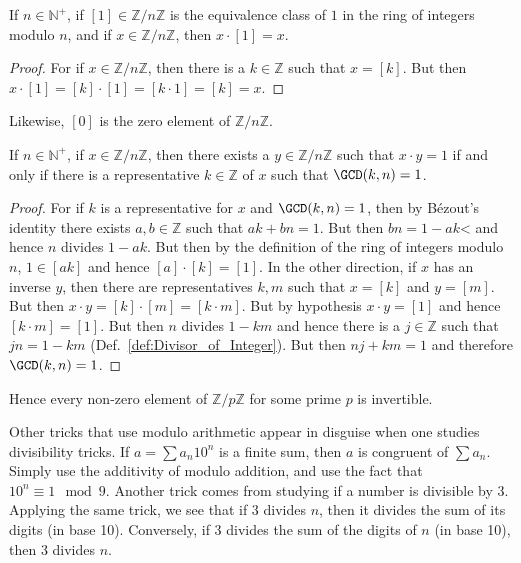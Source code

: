 \documentclass{article}                                                        %
\begin{document}
            \begin{theorem}
                \label{thm:Equiv_Class_of_1_is_1_Mod_n}%
                If $n\in\mathbb{N}^{+}$, if $[1]\in\mathbb{Z}/n\mathbb{Z}$ is the
                equivalence class of $1$ in the ring of integers modulo $n$, and if
                $x\in\mathbb{Z}/n\mathbb{Z}$, then $x\cdot[1]=x$.
            \end{theorem}
            \begin{proof}
                For if $x\in\mathbb{Z}/n\mathbb{Z}$, then there is a
                $k\in\mathbb{Z}$ such that $x=[k]$. But then
                $x\cdot[1]=[k]\cdot[1]=[k\cdot{1}]=[k]=x$.
            \end{proof}
            Likewise, $[0]$ is the zero element of $\mathbb{Z}/n\mathbb{Z}$.
            \begin{theorem}
                \label{thm:Invertible_Mod_n_iff_Relatively_Prime}%
                If $n\in\mathbb{N}^{+}$, if $x\in\mathbb{Z}/n\mathbb{Z}$, then there
                exists a $y\in\mathbb{Z}/n\mathbb{Z}$ such that $x\cdot{y}=1$ if and
                only if there is a representative $k\in\mathbb{Z}$ of $x$ such that
                $\GCD(k,n)=1$.
            \end{theorem}
            \begin{proof}
                For if $k$ is a representative for $x$ and $\GCD(k,n)=1$, then
                by B\'{e}zout's identity there exists $a,b\in\mathbb{Z}$ such that
                $ak+bn=1$. But then $bn=1-ak$< and hence $n$ divides $1-ak$. But
                then by the definition of the ring of integers modulo $n$,
                $1\in[ak]$ and hence $[a]\cdot[k]=[1]$. In the other direction, if
                $x$ has an inverse $y$, then there are representatives $k,m$ such
                that $x=[k]$ and $y=[m]$. But then
                $x\cdot{y}=[k]\cdot[m]=[k\cdot{m}]$. But by hypothesis
                $x\cdot{y}=[1]$ and hence $[k\cdot{m}]=[1]$. But then
                $n$ divides $1-km$ and hence there is a $j\in\mathbb{Z}$ such that
                $jn=1-km$ (Def.~\ref{def:Divisor_of_Integer}). But then
                $nj+km=1$ and therefore $\GCD(k,n)=1$.
            \end{proof}
            Hence every non-zero element of $\mathbb{Z}/p\mathbb{Z}$ for some prime
            $p$ is invertible.
            \begin{example}
                Other tricks that use modulo arithmetic appear in disguise when one
                studies divisibility tricks. If $a=\sum{a}_{n}10^{n}$ is a finite
                sum, then $a$ is congruent of $\sum{a}_{n}$. Simply use the
                additivity of modulo addition, and use the fact that
                $10^{n}\equiv{1}\mod{9}$. Another trick comes from studying if a
                number is divisible by 3. Applying the same trick, we see that if
                3 divides $n$, then it divides the sum of its digits (in base 10).
                Conversely, if 3 divides the sum of the digits of $n$ (in base 10),
                then 3 divides $n$.
            \end{example}
\end{document}
